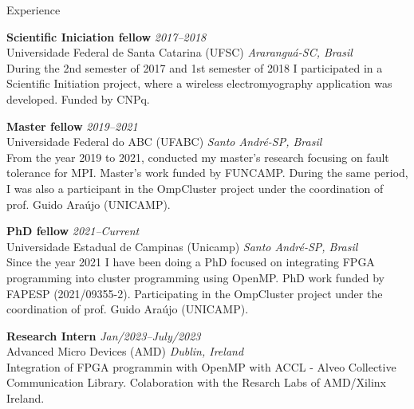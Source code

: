\documentclass[a4paper]{resume}
\begin{document}

\begin{rSection}{Experience}


{\bf Scientific Iniciation fellow} \hfill{\em 2017--2018} \\
{\sc Universidade Federal de Santa Catarina (UFSC)} \hfill {\em Araranguá-SC, Brasil} \\
During the 2nd semester of 2017 and 1st semester of 2018 I participated in a Scientific Initiation project, where a wireless electromyography application was developed. Funded by CNPq.

{\bf Master fellow} \hfill{\em 2019--2021} \\
{\sc Universidade Federal do ABC (UFABC)} \hfill {\em Santo André-SP, Brasil} \\
From the year 2019 to 2021, conducted my master's research focusing on fault tolerance for MPI. Master's work funded by FUNCAMP. During the same period, I was also a participant in the OmpCluster project under the coordination of prof. Guido Araújo (UNICAMP).

{\bf PhD fellow} \hfill{\em 2021--Current} \\
{\sc Universidade Estadual de Campinas (Unicamp)} \hfill {\em Santo André-SP, Brasil} \\
Since the year 2021 I have been doing a PhD focused on integrating FPGA programming into cluster programming using OpenMP. PhD work funded by FAPESP (2021/09355-2). Participating in the OmpCluster project under the coordination of prof. Guido Araújo (UNICAMP).

{\bf Research Intern} \hfill{\em Jan/2023--July/2023} \\
{\sc Advanced Micro Devices (AMD)} \hfill {\em Dublin, Ireland} \\
Integration of FPGA programmin with OpenMP with ACCL - Alveo Collective Communication Library. Colaboration with the Resarch Labs of AMD/Xilinx Ireland.
\end{rSection}
\end{document}

